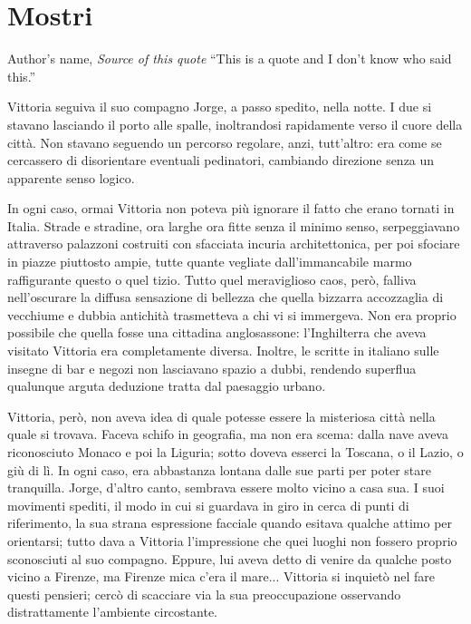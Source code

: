 \chapter{Mostri}

\begin{chapquote}{Author's name, \textit{Source of this quote}}
``This is a quote and I don't know who said this.''
\end{chapquote}


Vittoria seguiva il suo compagno Jorge, a passo spedito, nella notte. I due si stavano lasciando il porto alle spalle, inoltrandosi rapidamente verso il cuore della città. Non stavano seguendo un percorso regolare, anzi, tutt'altro: era come se cercassero di disorientare eventuali pedinatori, cambiando direzione senza un apparente senso logico.

In ogni caso, ormai Vittoria non poteva più ignorare il fatto che erano tornati in Italia. Strade e stradine, ora larghe ora fitte senza il minimo senso, serpeggiavano attraverso palazzoni costruiti con sfacciata incuria architettonica, per poi sfociare in piazze piuttosto ampie, tutte quante vegliate dall'immancabile marmo raffigurante questo o quel tizio. Tutto quel meraviglioso caos, però, falliva nell'oscurare la diffusa sensazione di bellezza che quella bizzarra accozzaglia di vecchiume e dubbia antichità trasmetteva a chi vi si immergeva. Non era proprio possibile che quella fosse una cittadina anglosassone: l'Inghilterra che aveva visitato Vittoria era completamente diversa. Inoltre, le scritte in italiano sulle insegne di bar e negozi non lasciavano spazio a dubbi, rendendo superflua qualunque arguta deduzione tratta dal paesaggio urbano.

Vittoria, però, non aveva idea di quale potesse essere la misteriosa città nella quale si trovava. Faceva schifo in geografia, ma non era scema: dalla nave aveva riconosciuto Monaco e poi la Liguria; sotto doveva esserci la Toscana, o il Lazio, o giù di lì. In ogni caso, era abbastanza lontana dalle sue parti per poter stare tranquilla. Jorge, d'altro canto, sembrava essere molto vicino a casa sua. I suoi movimenti spediti, il modo in cui si guardava in giro in cerca di punti di riferimento, la sua strana espressione facciale quando esitava qualche attimo per orientarsi; tutto dava a Vittoria l'impressione che quei luoghi non fossero proprio sconosciuti al suo compagno. Eppure, lui aveva detto di venire da qualche posto vicino a Firenze, ma Firenze mica c'era il mare... Vittoria si inquietò nel fare questi pensieri; cercò di scacciare via la sua preoccupazione osservando distrattamente l'ambiente circostante.

